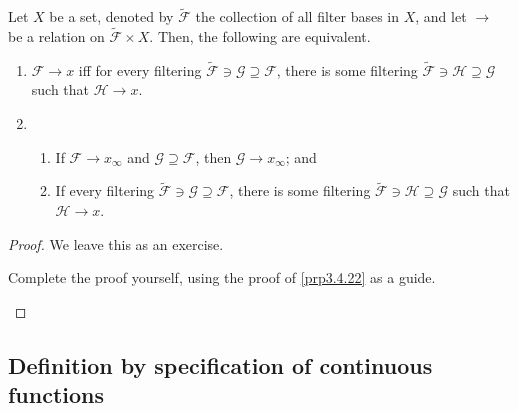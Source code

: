 \begin{prp}
Let $X$ be a set, denoted by $\tilde{\mathcal{F}}$ the collection of all filter bases in $X$, and let $\to$ be a relation on $\tilde{\mathcal{F}}\times X$.  Then, the following are equivalent.
\begin{enumerate}
\item $\mathcal{F}\to x$ iff for every filtering $\tilde{\mathcal{F}}\ni \mathcal{G}\supseteq \mathcal{F}$, there is some filtering $\tilde{\mathcal{F}}\ni \mathcal{H}\supseteq \mathcal{G}$ such that $\mathcal{H}\to x$.
\item \begin{enumerate}
\item If $\mathcal{F}\to x_\infty$ and $\mathcal{G}\supseteq \mathcal{F}$, then $\mathcal{G}\to x_\infty$; and
\item If every filtering $\tilde{\mathcal{F}}\ni \mathcal{G}\supseteq \mathcal{F}$, there is some filtering $\tilde{\mathcal{F}}\ni \mathcal{H}\supseteq \mathcal{G}$ such that $\mathcal{H}\to x$.
\end{enumerate}
\end{enumerate}
\begin{proof}
We leave this as an exercise.
\begin{exr}
Complete the proof yourself, using the proof of \cref{prp3.4.22} as a guide.
\end{exr}
\end{proof}
\end{prp}

\subsection{Definition by specification of continuous functions}

